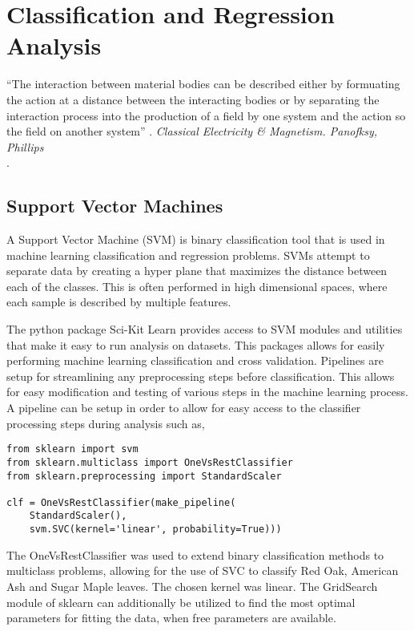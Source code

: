 \chapter{Classification and Regression Analysis}
\begin{center}
  \begin{minipage}{0.75\textwidth}
    \begin{small}
      “The interaction between material bodies can be described either by formuating the action at a distance between the interacting bodies or by separating the interaction process into the production of a field by one system and the action so the field on another system” .
      \emph{Classical Electricity \& Magnetism. Panofksy, Phillips}\\.
    \end{small}
  \end{minipage}
  \vspace{0.5cm}
\end{center}

\section{Support Vector Machines}
A Support Vector Machine (SVM) is binary classification tool that is used in machine learning classification and regression problems.  SVMs attempt to separate data by creating a hyper plane that maximizes the distance between each of the classes.  This is often performed in high dimensional spaces, where each sample is described by multiple features.

The python package Sci-Kit Learn provides access to SVM modules and utilities that make it easy to run analysis on datasets.  This packages allows for easily performing machine learning classification and cross validation.  Pipelines are setup for streamlining any preprocessing steps before classification.  This allows for easy modification and testing of various steps in the machine learning process.  A pipeline can be setup in order to allow for easy access to the classifier processing steps during analysis such as,
%
\begin{lstlisting}
from sklearn import svm
from sklearn.multiclass import OneVsRestClassifier
from sklearn.preprocessing import StandardScaler

clf = OneVsRestClassifier(make_pipeline(
	StandardScaler(),
	svm.SVC(kernel='linear', probability=True)))

\end{lstlisting}
%
The OneVsRestClassifier was used to extend binary classification methods to multiclass problems, allowing for the use of SVC to classify Red Oak, American Ash and Sugar Maple leaves.  The chosen kernel was linear.  The GridSearch module of sklearn can additionally be utilized to find the most optimal parameters for fitting the data, when free parameters are available.

